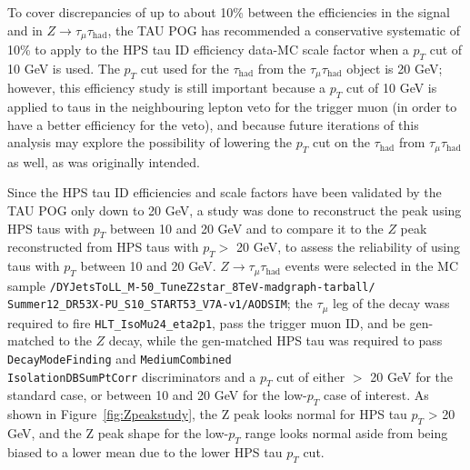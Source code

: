 To cover discrepancies of up to about 10\% between the efficiencies in the signal and in $Z\rightarrow\tau_{\mu}\tau_{\text{had}}$, the TAU POG has recommended a conservative systematic of 10\% to apply to the HPS tau ID efficiency data-MC scale factor when a $p_T$ cut of 10 GeV is used. The $p_T$ cut used for the $\tau_{\text{had}}$ from the $\tau_{\mu}\tau_{\text{had}}$ object is 20 GeV; however, this efficiency study is still important because a $p_T$ cut of 10 GeV is applied to taus in the neighbouring lepton veto for the trigger muon (in order to have a better efficiency for the veto), and because future iterations of this analysis may explore the possibility of lowering the $p_T$ cut on the $\tau_{\text{had}}$ from $\tau_{\mu}\tau_{\text{had}}$ as well, as was originally intended.

Since the HPS tau ID efficiencies and scale factors have been validated by the TAU POG only down to 20 GeV, a study was done to reconstruct the \Z peak using HPS taus with $p_T$ between 10 and 20 GeV and to compare it to the $Z$ peak reconstructed from HPS taus with $p_T >$ 20 GeV, to assess the reliability of using taus with $p_T$ between 10 and 20 GeV. $Z\rightarrow\tau_{\mu}\tau_{\text{had}}$ events were selected in the MC sample \texttt{/DYJetsToLL\_M-50\_TuneZ2star\_8TeV-madgraph-tarball/\\Summer12\_DR53X-PU\_S10\_START53\_V7A-v1/AODSIM}; the $\tau_{\mu}$ leg of the \Z decay wass required to fire \texttt{HLT\_IsoMu24\_eta2p1}, pass the trigger muon ID, and be gen-matched to the $Z$ decay, while the gen-matched HPS tau was required to pass \texttt{DecayModeFinding} and \texttt{MediumCombined\\IsolationDBSumPtCorr} discriminators and a $p_T$ cut of either $>$ 20 GeV for the standard case, or between 10 and 20 GeV for the low-$p_T$ case of interest. As shown in Figure~\ref{fig:Zpeakstudy}, the Z peak looks normal for HPS tau $p_T$ \textgreater\xspace 20 GeV, and the Z peak shape for the low-$p_T$ range looks normal aside from being biased to a lower mean due to the lower HPS tau $p_T$ cut.

